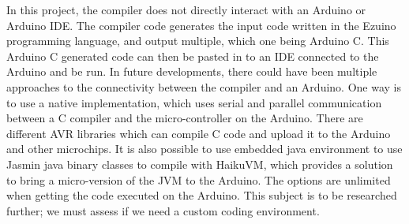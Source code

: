 In this project, the compiler does not directly interact with an Arduino or Arduino IDE. The compiler code generates the input code written in the Ezuino programming language, and output multiple, which one being Arduino C. This Arduino C generated code can then be pasted in to an IDE connected to the Arduino and be run. In future developments, there could have been multiple approaches to the connectivity between the compiler and an Arduino. One way is to use a native implementation, which uses serial and parallel communication between a C compiler and the micro-controller on the Arduino. There are different AVR libraries which can compile C code and upload it to the Arduino and other microchips. It is also possible to use embedded java environment to use Jasmin java binary classes to compile with HaikuVM, which provides a solution to bring a micro-version of the JVM to the Arduino.
The options are unlimited when getting the code executed on the Arduino. This subject is to be researched further; we must assess if we need a custom coding environment.